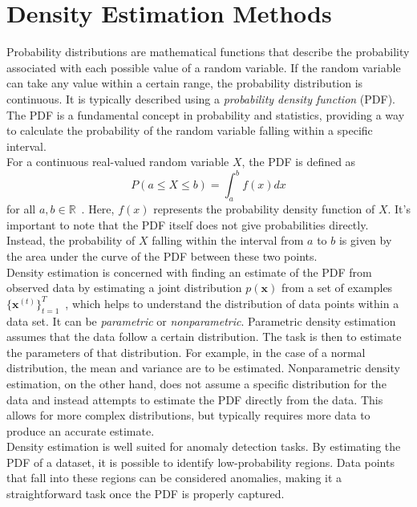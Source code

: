 \section{Density Estimation Methods}
Probability distributions are mathematical functions that describe the probability associated with each possible value of a random variable. If the random variable can take any value within a certain range, the probability distribution is continuous. It is typically described using a \textit{probability density function} (PDF). The PDF is a fundamental concept in probability and statistics, providing a way to calculate the probability of the random variable falling within a specific interval. \\
For a continuous real-valued random variable $X$, the PDF is defined as
\[ P(a\leq X\leq b)=\int_a^bf(x)dx \]
for all $ a, b \in \mathbb{R}$~\cite{grinstead2006probabilities}. Here, $f(x)$ represents the probability density function of $X$. It's important to note that the PDF itself does not give probabilities directly. Instead, the probability of $X$ falling within the interval from $a$ to $b$ is given by the area under the curve of the PDF between these two points.\\
Density estimation is concerned with finding an estimate of the PDF from observed data by estimating a joint distribution $ p(\mathbf{x}) $ from a set of examples $ \{ \mathbf{x}^{(t)}\}^T_{t=1} $~\cite{germain2015made}, which helps to understand the distribution of data points within a data set. It can be \textit{parametric} or \textit{nonparametric}. Parametric density estimation assumes that the data follow a certain distribution. The task is then to estimate the parameters of that distribution. For example, in the case of a normal distribution, the mean and variance are to be estimated. Nonparametric density estimation, on the other hand, does not assume a specific distribution for the data and instead attempts to estimate the PDF directly from the data. This allows for more complex distributions, but typically requires more data to produce an accurate estimate.\\
Density estimation is well suited for anomaly detection tasks. By estimating the PDF of a dataset, it is possible to identify low-probability regions. Data points that fall into these regions can be considered anomalies, making it a straightforward task once the PDF is properly captured.


